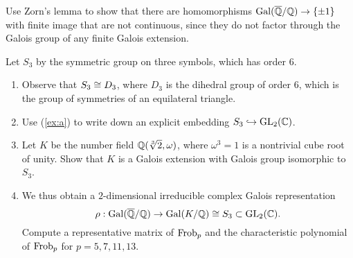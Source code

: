 {\begin{exercise}
	\begin{hint}
		Use Zorn's lemma to show that there are homomorphisms
		$\operatorname{Gal}(\overline{\mathbb{Q}}/\mathbb{Q})\to\{\pm 1\}$ with finite image that are not continuous,
		since they do not factor through the Galois group of any
		finite Galois extension.
	\end{hint}
	
\end{exercise}

\begin{exercise}
	Let $S_3$ by the symmetric group on three symbols, which has order $6$.
	\begin{enumerate}
		\item \label{ex:a} Observe that $S_3\cong D_3$, where $D_3$ is
		the dihedral group of order $6$, which is the group of symmetries of
		an equilateral triangle.
		\item Use (\ref{ex:a}) to write down an explicit
		embedding $S_3\hookrightarrow \operatorname{GL}_2(\mathbb{C})$.
		\item Let $K$ be the number field $\mathbb{Q}(\sqrt[3]{2},\omega)$,
		where $\omega^3=1$ is a nontrivial cube root of unity.  Show
		that $K$ is a Galois extension with Galois group isomorphic to~$S_3$.
		\item We thus obtain a $2$-dimensional irreducible complex
		Galois representation
		$$
		\rho:\operatorname{Gal}(\overline{\mathbb{Q}}/\mathbb{Q}) \to \operatorname{Gal}(K/\mathbb{Q})\cong S_3 \subset \operatorname{GL}_2(\mathbb{C}).
		$$
		Compute a representative matrix of $\operatorname{Frob}_p$ and the characteristic polynomial
		of $\operatorname{Frob}_p$ for $p=5,7,11,13$.
	\end{enumerate}
\end{exercise}

}
